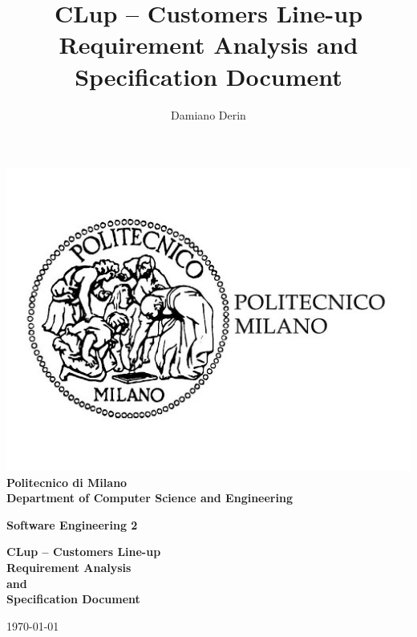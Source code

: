 \title{CLup – Customers Line-up \\ Requirement Analysis and Specification Document}
\author{Damiano Derin}

\begin{titlepage}
    \begin{center}
    \BgThispage
    \includegraphics[scale=0.3]{images/polimi_logo.jpg}\\
    {\LARGE {\bfseries Politecnico di Milano \\}}
    \vspace{.5cm}
    {\Large {\bfseries Department of Computer Science and Engineering \\}}
    \vspace{1.0cm}
    
    {\Large {\bfseries Software Engineering 2 \\}}
    \vspace{2.0cm}
    
    
    {\LARGE {\bfseries CLup – Customers Line-up \\
    	Requirement Analysis \\ and \\ Specification Document\\}}
    \vspace{1cm}

    {\large \today \\
    }



\end{center}
\end{titlepage}
